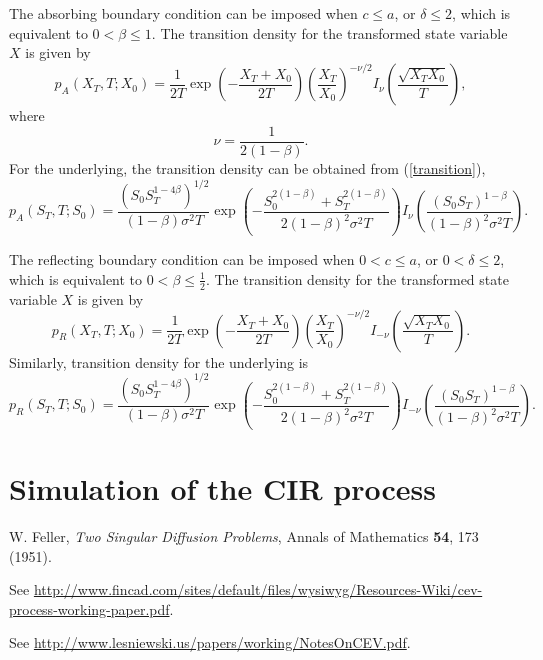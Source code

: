 \documentclass[12pt]{article}
\begin{document}
  The absorbing boundary condition can be imposed when $c\le a$, or $\delta\le 2$, which is equivalent to
  $0<\beta\le 1$. The transition density for the transformed state variable $X$ is given by
  \begin{equation}
    p_A(X_T,T;X_0)=\frac{1}{2T}\exp\left(-\frac{X_T+X_0}{2T}\right)\left(\frac{X_T}{X_0}\right)^{-\nu/2}
                    I_{\nu}\left(\frac{\sqrt{X_TX_0}}{T}\right),
    \label{transition}
  \end{equation}
  where
  \begin{equation}
    \nu=\frac{1}{2(1-\beta)}.
  \end{equation}
  For the underlying, the transition density \cite{Lesniewski} can be obtained from (\ref{transition}),
  \begin{equation}
    p_A(S_T,T;S_0)=\frac{\left(S_0S_T^{1-4\beta}\right)^{1/2}}{(1-\beta)\sigma^2T}
                  \exp\left(-\frac{S_0^{2(1-\beta)}+S_T^{2(1-\beta)}}{2(1-\beta)^2\sigma^2T}\right)
                    I_{\nu}\left(\frac{(S_0S_T)^{1-\beta}}{(1-\beta)^2\sigma^2T}\right).
  \end{equation}

  The reflecting boundary condition can be imposed when $0<c\le a$, or $0<\delta\le 2$, which is equivalent to
  $0<\beta\le \frac{1}{2}$. The transition density for the transformed state variable $X$ is given by
  \begin{equation}
    p_R(X_T,T;X_0)=\frac{1}{2T}\exp\left(-\frac{X_T+X_0}{2T}\right)\left(\frac{X_T}{X_0}\right)^{-\nu/2}
                    I_{-\nu}\left(\frac{\sqrt{X_TX_0}}{T}\right).
  \end{equation}
  Similarly, transition density for the underlying is
  \begin{equation}
    p_R(S_T,T;S_0)=\frac{\left(S_0S_T^{1-4\beta}\right)^{1/2}}{(1-\beta)\sigma^2T}
                  \exp\left(-\frac{S_0^{2(1-\beta)}+S_T^{2(1-\beta)}}{2(1-\beta)^2\sigma^2T}\right)
                    I_{-\nu}\left(\frac{(S_0S_T)^{1-\beta}}{(1-\beta)^2\sigma^2T}\right).
  \end{equation}

\section{Simulation of the CIR process}


\begin{thebibliography}{99}
    W. Feller, {\it Two Singular Diffusion Problems}, Annals of Mathematics {\bf 54}, 173 (1951).

    See \url{http://www.fincad.com/sites/default/files/wysiwyg/Resources-Wiki/cev-process-working-paper.pdf}.

    See \url{http://www.lesniewski.us/papers/working/NotesOnCEV.pdf}.

\end{thebibliography}
\end{document}
